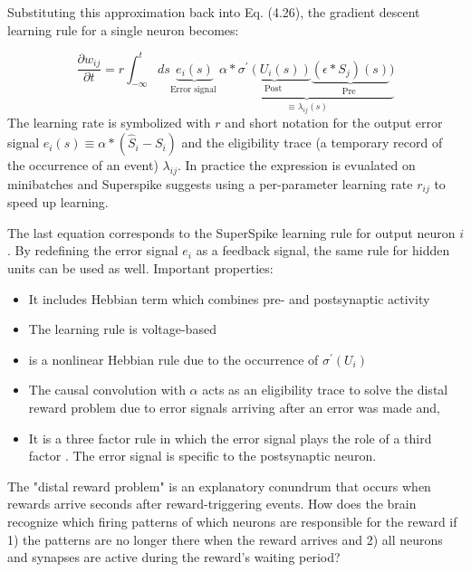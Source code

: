 \documentclass[12pt]{report}
\begin{document}
Substituting this approximation back into Eq. (4.26), the gradient descent learning rule for a single neuron becomes:

\begin{equation}
\label{eqn:superspike}
\frac{\partial w_{i j}}{\partial t}=r \int_{-\infty}^{t} d s \underbrace{e_{i}(s)}_{\text {Error signal }} \underbrace{\alpha * \underbrace{\sigma^{\prime}\left(U_{i}(s)\right)}_{\text {Post }} \underbrace{\left(\epsilon * S_{j}\right)(s)}_{\text {Pre }})}_{\equiv \lambda_{i j}(s)}
\end{equation}
The learning rate is symbolized with $r$ and short notation for the output error signal $e_{i}(s) \equiv \alpha *\left(\hat{S}_{i}-S_{i}\right)$ and the eligibility trace (a temporary
record of the occurrence of an event)  $\lambda_{i j} .$ In practice the expression  is evualated on minibatches and Superspike suggests using a per-parameter learning rate $r_{i j}$ to speed up learning.

The last equation corresponds to the SuperSpike learning rule for output neuron $i$. 
By redefining the error signal $e_{i}$ as a feedback signal, the same rule for hidden units can be used as well. Important properties: 
\begin{itemize}
  \item It includes Hebbian term which combines pre- and postsynaptic activity
  \item The learning rule is voltage-based
  \item is a nonlinear Hebbian rule due to the occurrence of $\sigma^{\prime}\left(U_{i}\right)$
  \item The causal convolution with $\alpha$ acts as an eligibility trace to solve the distal reward problem due to error signals arriving after an error was made \cite{izike2007} and,
  \item It is a three factor rule in which the error signal plays the role of a third factor \cite{fremaux2016} . The error signal is specific to the postsynaptic neuron.
\end{itemize}
The "distal reward problem" is an explanatory conundrum  that occurs when rewards arrive seconds after reward-triggering events. How does the brain recognize which firing patterns of which neurons are responsible for the reward if 1) the patterns are no longer there when the reward arrives and 2) all neurons and synapses are active during the reward's waiting period?
\end{document}
